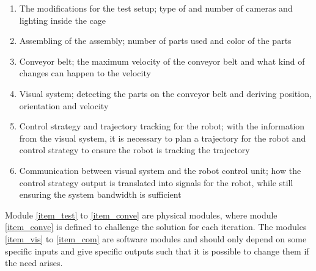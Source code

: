\begin{enumerate}
  \item The modifications for the test setup; type of and number of cameras and lighting inside the cage \label{item_test}
  \item Assembling of the assembly; number of parts used and color of the parts  \label{item_assem}
  \item Conveyor belt; the maximum velocity of the conveyor belt and what kind of changes can happen to the velocity \label{item_conve}
  \item Visual system; detecting the parts on the conveyor belt and deriving position, orientation and velocity \label{item_vis}
  \item Control strategy and trajectory tracking for the robot; with the information from the visual system, it is necessary to plan a trajectory for the robot and control strategy to ensure the robot is tracking the trajectory \label{item_control}
  \item Communication between visual system and the robot control unit; how the control strategy output is translated into signals for the robot, while still ensuring the system bandwidth is sufficient \label{item_com}
   
\end{enumerate}
Module \ref{item_test} to \ref{item_conve} are physical modules, where module \ref{item_conve} is defined to challenge the solution for each iteration. The modules \ref{item_vis} to \ref{item_com} are software modules and should only depend on some specific inputs and give specific outputs such that it is possible to change them if the need arises. 



























 
